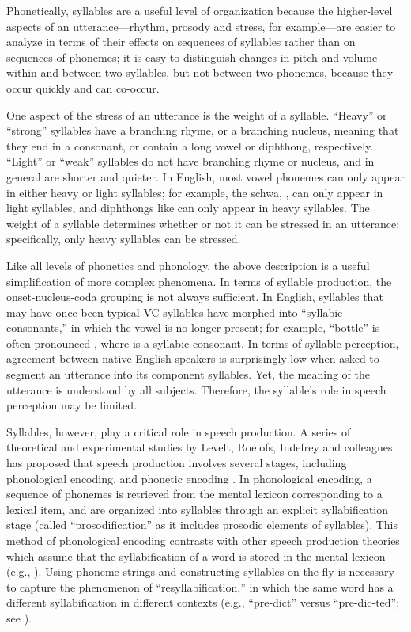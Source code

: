 Phonetically, syllables are a useful
level of organization because
the higher-level aspects
of an utterance---rhythm, prosody and stress,
for example---are easier to analyze
in terms of their effects on
sequences of syllables rather than
on sequences of phonemes;
it is easy to distinguish
changes in pitch and volume
within and between two syllables,
but not between two phonemes,
because they occur quickly
and can co-occur.

One aspect of the stress of an utterance
is the weight of a syllable.
``Heavy'' or ``strong'' syllables
have a branching rhyme,
or a branching nucleus,
meaning that they
end in a consonant,
or contain a long vowel or diphthong,
respectively.
``Light'' or ``weak'' syllables
do not have branching rhyme or nucleus,
and in general are shorter
and quieter.
In English, most vowel phonemes
can only appear in either
heavy or light syllables;
for example, the schwa, \ipa{[@]},
can only appear in light syllables,
and diphthongs like \ipa{[aU]}
can only appear in heavy syllables.
The weight of a syllable determines
whether or not it can be stressed
in an utterance;
specifically, only heavy syllables
can be stressed.

Like all levels of phonetics and phonology,
the above description is a useful simplification
of more complex phenomena.
In terms of syllable production,
the onset-nucleus-coda grouping
is not always sufficient.
In English, syllables that may have once
been typical VC syllables have morphed
into ``syllabic consonants,'' in which
the vowel is no longer present;
for example, ``bottle'' is often
pronounced \ipa{[b6tl]},
where \ipa{[l]} is a syllabic consonant.
In terms of syllable perception,
agreement between native English speakers
is surprisingly low when
asked to segment an utterance
into its component syllables.
Yet, the meaning of the utterance
is understood by all subjects.
Therefore, the syllable's
role in speech perception may be limited.

Syllables, however, play a critical role
in speech production.
A series of theoretical and experimental studies
by Levelt, Roelofs, Indefrey and colleagues
has proposed that speech production
involves several stages,
including phonological encoding,
and phonetic encoding
\citep{levelt1999,roelofs2000,cholin2004,indefrey2004,indefrey2011}.
In phonological encoding,
a sequence of phonemes is retrieved
from the mental lexicon corresponding
to a lexical item,
and are organized into syllables
through an explicit syllabification stage
(called ``prosodification'' as it
includes prosodic elements of syllables).
This method of phonological encoding
contrasts with other speech production theories
which assume that the syllabification
of a word is stored in the mental lexicon
(e.g., \citealt{dell1988}).
Using phoneme strings and constructing
syllables on the fly
is necessary to capture
the phenomenon of ``resyllabification,''
in which the same word
has a different syllabification
in different contexts
(e.g., ``pre-dict'' versus
``pre-dic-ted'';
see \citealt{cholin2004}).

